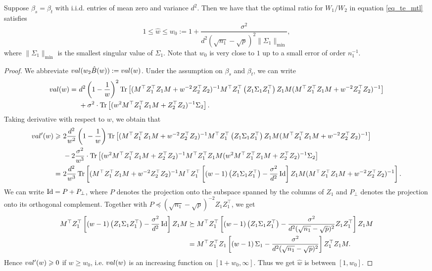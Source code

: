 {\color{blue}
\begin{proposition} 
	Suppose $\beta_s = \beta_t$ with i.i.d. entries of mean zero and variance $d^2$. Then we have that the optimal ratio for $W_1/W_2$ in equation \eqref{eq_te_mtl} satisfies 
	$$1\le \hat{w} \le w_0:=1 + \frac{\sigma^2}{d^2(\sqrt{n_1}-\sqrt{p})^2 \|\Sigma_1\|_{\min}},$$ 
	where $\|\Sigma_1\|_{\min}$ is the smallest singular value of $\Sigma_1$. Note that $w_0$ is very close to $1$ up to a small error of order $n_1^{-1}$.
\end{proposition}
\begin{proof}
We abbreviate $val(w_2\hat{B}(w)):=val(w)$. Under the assumption on $\beta_s$ and $\beta_t$, we can write
\begin{align}
	val(w) =&~ d^2 \left( 1-\frac1w\right)^2 \operatorname{Tr}\left[( M^\top Z_1^{\top}Z_1 M + w^{-2}Z_2^{\top}Z_2)^{-1} M^\top Z_1^{\top}\left(Z_1 \Sigma_1 Z_1^{\top}\right) Z_1 M ( M^\top Z_1^{\top}Z_1 M + w^{-2}Z_2^{\top}Z_2)^{-1}\right] \nonumber \\
			&~ + \sigma^2 \cdot \operatorname{Tr}\left[(w^2 M^\top Z_1^{\top}Z_1 M + Z_2^{\top}Z_2)^{-1} \Sigma_2\right].  \nonumber
\end{align}
Taking derivative with respect to $w$, we obtain that 
\begin{align*}
val'(w) \geqslant &~ 2\frac{d^2}{w^2} \left( 1-\frac1w\right) \operatorname{Tr}\left[( M^\top Z_1^{\top}Z_1 M + w^{-2}Z_2^{\top}Z_2)^{-1} M^\top Z_1^{\top}\left(Z_1 \Sigma_1 Z_1^{\top}\right) Z_1 M ( M^\top Z_1^{\top}Z_1 M + w^{-2}Z_2^{\top}Z_2)^{-1}\right]   \\
			&~ - 2 \frac{\sigma^2}{w^3} \cdot \operatorname{Tr}\left[(w^2 M^\top Z_1^{\top}Z_1 M + Z_2^{\top}Z_2)^{-1} M^\top Z_1^{\top}Z_1 M (w^2 M^\top Z_1^{\top}Z_1 M + Z_2^{\top}Z_2)^{-1}\Sigma_2\right] \\
			=& ~ 2\frac{d^2}{w^3} \operatorname{Tr}\left[( M^\top Z_1^{\top}Z_1 M + w^{-2}Z_2^{\top}Z_2)^{-1} M^\top Z_1^{\top} \left[\left( w-1\right)\left(Z_1 \Sigma_1 Z_1^{\top}\right) - \frac{\sigma^2}{d^2}\operatorname{Id} \right] Z_1 M ( M^\top Z_1^{\top}Z_1 M + w^{-2}Z_2^{\top}Z_2)^{-1}\right]  .
\end{align*}
We can write $\operatorname{Id} = P+ P_{\perp}$, where $P$ denotes the projection onto the subspace spanned by the columns of $Z_1$ and $P_{\perp}$ denotes the projection onto its orthogonal complement. Together with $P\preceq (\sqrt{n_1}-\sqrt{p})^{-2} Z_1 Z_1^\top$, we get
\begin{align*}
M^\top Z_1^{\top} \left[\left( w-1\right)\left(Z_1 \Sigma_1 Z_1^{\top}\right) - \frac{\sigma^2}{d^2}\operatorname{Id} \right] Z_1 M  &\succeq M^\top Z_1^{\top} \left[\left( w-1\right)\left(Z_1 \Sigma_1 Z_1^{\top}\right) - \frac{\sigma^2}{d^2(\sqrt{n_1}-\sqrt{p})^{2}} Z_1 Z_1^\top \right] Z_1 M  \\
&= M^\top Z_1^{\top}Z_1  \left[\left( w-1\right) \Sigma_1  - \frac{\sigma^2}{d^2(\sqrt{n_1}-\sqrt{p})^{2}} \right] Z_1^\top Z_1 M .
\end{align*}
Hence $val'(w)\geqslant 0$ if $w\ge w_0$, i.e. $val(w)$ is an increasing function on $[1+w_0,\infty]$. Thus we get $\hat w$ is between $[1,w_0]$. 
\end{proof}
}

